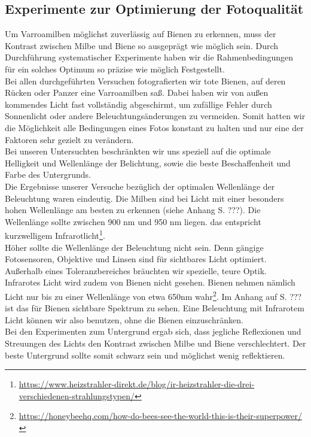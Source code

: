\documentclass[11pt,a4paper]{article}
\begin{document}
\subsection{Experimente zur Optimierung der Fotoqualität}
Um Varroamilben möglichst zuverlässig auf Bienen zu erkennen, muss der Kontrast zwischen Milbe und Biene so ausgeprägt wie möglich sein. Durch Durchführung systematischer Experimente haben wir die Rahmenbedingungen für ein solches Optimum so präzise wie möglich Festgestellt.\\
Bei allen durchgeführten Versuchen fotografierten wir tote Bienen, auf deren Rücken oder Panzer eine Varroamilben saß. Dabei haben wir von außen kommendes Licht fast vollständig abgeschirmt, um zufällige Fehler durch Sonnenlicht oder andere Beleuchtungsänderungen zu vermeiden. Somit hatten wir die Möglichkeit alle Bedingungen eines Fotos konstant zu halten und nur eine der Faktoren sehr gezielt zu verändern.\\
Bei unseren Untersuchten beschränkten wir uns speziell auf die optimale Helligkeit und Wellenlänge der Belichtung, sowie die beste Beschaffenheit und Farbe des Untergrunds.\\
Die Ergebnisse unserer Versuche bezüglich der optimalen Wellenlänge der Beleuchtung waren eindeutig. Die Milben sind bei Licht mit einer besonders hohen Wellenlänge am besten zu erkennen (siehe Anhang S. ???). Die Wellenlänge sollte zwischen 900 nm und 950 nm liegen. das entspricht kurzwelligem Infrarotlicht\footnote{\url{https://www.heizstrahler-direkt.de/blog/ir-heizstrahler-die-drei-verschiedenen-strahlungstypen/}}.\\
Höher sollte die Wellenlänge der Beleuchtung nicht sein. Denn gängige Fotosensoren, Objektive und Linsen sind für sichtbares Licht optimiert. Außerhalb eines Toleranzbereiches bräuchten wir spezielle, teure Optik.\\
Infrarotes Licht wird zudem von Bienen nicht gesehen. Bienen nehmen nämlich Licht nur bis zu einer Wellenlänge von etwa 650nm wahr\footnote{\url{https://honeybeehq.com/how-do-bees-see-the-world-this-is-their-superpower/}}. Im Anhang auf S. ??? ist das für Bienen sichtbare Spektrum zu sehen. Eine Beleuchtung mit Infrarotem Licht können wir also benutzen, ohne die Bienen einzuschränken.\\
Bei den Experimenten zum Untergrund ergab sich, dass jegliche Reflexionen und Streuungen des Lichts den Kontrast zwischen Milbe und Biene verschlechtert. Der beste Untergrund sollte somit schwarz sein und möglichst wenig reflektieren.
\end{document}
